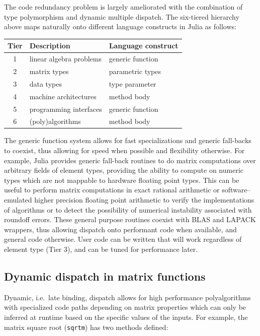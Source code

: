 \documentclass[pldi]{sigplanconf-pldi15}
\begin{document}
The code redundancy problem is largely ameliorated with the combination of type
polymorphism and dynamic multiple dispatch. The six-tiered hierarchy above maps
naturally onto different language constructs in Julia as follows:

\vspace{12pt}
\begin{tabular}{c l l}
	\hline
	Tier & Description & Language construct \\ \hline
	1 & linear algebra problems & generic function \\
	2 & matrix types & parametric types \\
	3 & data types & type parameter \\
	4 & machine architectures & method body \\
	5 & programming interfaces & generic function \\
	6 & (poly)algorithms & method body \\ \hline
\end{tabular}
\vspace{12pt}

The generic function system allows for fast specializations and generic
fall-backs to coexist, thus allowing for speed when possible and flexibility
otherwise. For example, Julia provides generic fall-back routines to do matrix
computations over arbitrary fields of element types, providing the ability to
compute on numeric types which are not mappable to hardware floating point
types. This can be useful to perform matrix computations in exact rational
arithmetic or software--emulated higher precision floating point arithmetic to
verify the implementations of algorithms or to detect the possibility of
numerical instability associated with roundoff errors. These general purpose
routines coexist with BLAS and LAPACK wrappers, thus allowing dispatch onto
performant code when available, and general code otherwise. User code can be
written that will work regardless of element type (Tier 3), and can be tuned
for performance later.

\subsection{Dynamic dispatch in matrix functions}

Dynamic, i.e.\ late binding, dispatch allows for high performance
polyalgorithms with specialized code paths depending on matrix properties which
can only be inferred at runtime based on the specific values of the inputs. For
example, the matrix square root (\verb|sqrtm|) has two methods defined:
\end{document}

